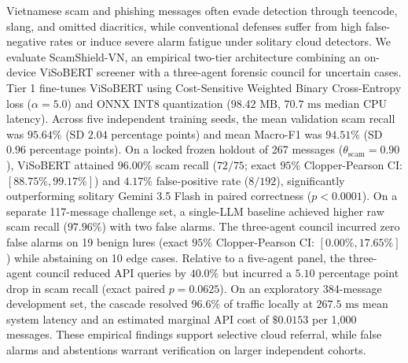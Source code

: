Vietnamese scam and phishing messages often evade detection through teencode, slang, and omitted diacritics, while conventional defenses suffer from high false-negative rates or induce severe alarm fatigue under solitary cloud detectors. We evaluate ScamShield-VN, an empirical two-tier architecture combining an on-device ViSoBERT screener with a three-agent forensic council for uncertain cases. Tier 1 fine-tunes ViSoBERT using Cost-Sensitive Weighted Binary Cross-Entropy loss ($\alpha = 5.0$) and ONNX INT8 quantization ($98.42\text{ MB}$, $70.7\text{ ms}$ median CPU latency). Across five independent training seeds, the mean validation scam recall was $95.64\%$ (SD $2.04$ percentage points) and mean Macro-F1 was $94.51\%$ (SD $0.96$ percentage points). On a locked frozen holdout of 267 messages ($\theta_{\text{scam}} = 0.90$), ViSoBERT attained $96.00\%$ scam recall ($72/75$; exact $95\%$ Clopper-Pearson CI: $[88.75\%, 99.17\%]$) and $4.17\%$ false-positive rate ($8/192$), significantly outperforming solitary Gemini 3.5 Flash in paired correctness ($p < 0.0001$). On a separate 117-message challenge set, a single-LLM baseline achieved higher raw scam recall ($97.96\%$) with two false alarms. The three-agent council incurred zero false alarms on 19 benign lures (exact $95\%$ Clopper-Pearson CI: $[0.00\%, 17.65\%]$) while abstaining on 10 edge cases. Relative to a five-agent panel, the three-agent council reduced API queries by $40.0\%$ but incurred a $5.10$ percentage point drop in scam recall (exact paired $p = 0.0625$). On an exploratory 384-message development set, the cascade resolved $96.6\%$ of traffic locally at $267.5\text{ ms}$ mean system latency and an estimated marginal API cost of $\$0.0153$ per 1,000 messages. These empirical findings support selective cloud referral, while false alarms and abstentions warrant verification on larger independent cohorts.
